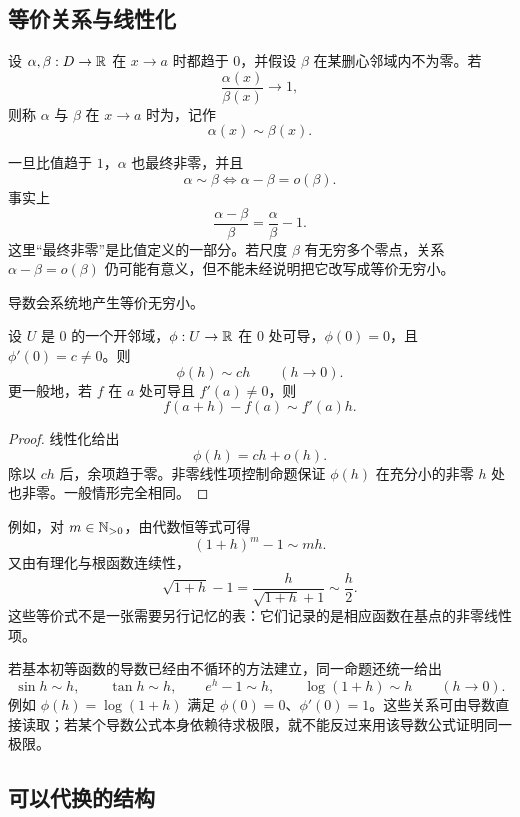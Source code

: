 \subsection{等价关系与线性化}

\begin{definition}[等价无穷小]
设 \(\alpha,\beta:D\to\mathbb{R}\) 在 \(x\to a\) 时都趋于 \(0\)，并假设 \(\beta\) 在某删心邻域内不为零。若
\[
 \frac{\alpha(x)}{\beta(x)}\longrightarrow1,
\]
则称 \(\alpha\) 与 \(\beta\) 在 \(x\to a\) 时为，记作
\[
 \alpha(x)\sim\beta(x).
\]
\end{definition}

一旦比值趋于 \(1\)，\(\alpha\) 也最终非零，并且
\[
 \alpha\sim\beta
 \iff \alpha-\beta=o(\beta).
\]
事实上
\[
 \frac{\alpha-\beta}{\beta}=\frac\alpha\beta-1.
\]
这里“最终非零”是比值定义的一部分。若尺度 \(\beta\) 有无穷多个零点，关系 \(\alpha-\beta=o(\beta)\) 仍可能有意义，但不能未经说明把它改写成等价无穷小。

导数会系统地产生等价无穷小。

\begin{proposition}[非零导数产生等价量]
设 \(U\) 是 \(0\) 的一个开邻域，\(\phi:U\to\mathbb{R}\) 在 \(0\) 处可导，\(\phi(0)=0\)，且 \(\phi'(0)=c\ne0\)。则
\[
 \phi(h)\sim ch\qquad(h\to0).
\]
更一般地，若 \(f\) 在 \(a\) 处可导且 \(f'(a)\ne0\)，则
\[
 f(a+h)-f(a)\sim f'(a)h.
\]
\end{proposition}

\begin{proof}
线性化给出
\[
 \phi(h)=ch+o(h).
\]
除以 \(ch\) 后，余项趋于零。非零线性项控制命题保证 \(\phi(h)\) 在充分小的非零 \(h\) 处也非零。一般情形完全相同。
\end{proof}

例如，对 \(m\in\mathbb{N}_{>0}\)，由代数恒等式可得
\[
 (1+h)^m-1\sim mh.
\]
又由有理化与根函数连续性，
\[
 \sqrt{1+h}-1
 =\frac{h}{\sqrt{1+h}+1}
 \sim\frac h2.
\]
这些等价式不是一张需要另行记忆的表：它们记录的是相应函数在基点的非零线性项。

若基本初等函数的导数已经由不循环的方法建立，同一命题还统一给出
\[
 \sin h\sim h,\qquad \tan h\sim h,\qquad
 e^h-1\sim h,\qquad \log(1+h)\sim h
 \qquad(h\to0).
\]
例如 \(\phi(h)=\log(1+h)\) 满足 \(\phi(0)=0\)、\(\phi'(0)=1\)。这些关系可由导数直接读取；若某个导数公式本身依赖待求极限，就不能反过来用该导数公式证明同一极限。

\subsection{可以代换的结构}

